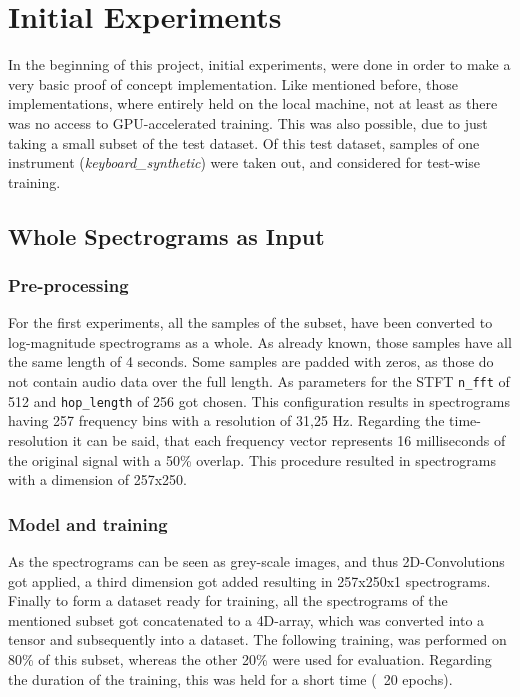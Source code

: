  
\section{Initial Experiments}
\label{sec:exp_init_experiment}
In the beginning of this project, initial experiments, were done in order to make a very basic proof of concept implementation. Like mentioned before, those implementations, where entirely held on the local machine, not at least as there was no access to GPU-accelerated training. This was also possible, due to just taking a small subset of the test dataset. Of this test dataset, samples of one instrument (\textit{keyboard\_synthetic}) were taken out, and considered for test-wise training.

\subsection{Whole Spectrograms as Input}

\subsubsection{Pre-processing}
For the first experiments, all the samples of the subset, have been converted to log-magnitude spectrograms as a whole. As already known, those samples have all the same length of 4 seconds. Some samples are padded with zeros, as those do not contain audio data over the full length. As parameters for the STFT \texttt{n\_fft} of 512 and \texttt{hop\_length} of 256 got chosen. This configuration results in spectrograms having 257 frequency bins with a resolution of 31,25 Hz. Regarding the time-resolution it can be said, that each frequency vector represents 16 milliseconds of the original signal with a 50\% overlap. This procedure resulted in spectrograms with a dimension of 257x250. 

\subsubsection{Model and training}
As the spectrograms can be seen as grey-scale images, and thus 2D-Convolutions got applied, a third dimension got added resulting in 257x250x1 spectrograms.  Finally to form a dataset ready for training, all the spectrograms of the mentioned subset got concatenated to a 4D-array, which was converted into a tensor and subsequently into a dataset. The following training, was performed on 80\% of this subset, whereas the other 20\% were used for evaluation. Regarding the duration of the training, this was held for a short time (~20 epochs).

